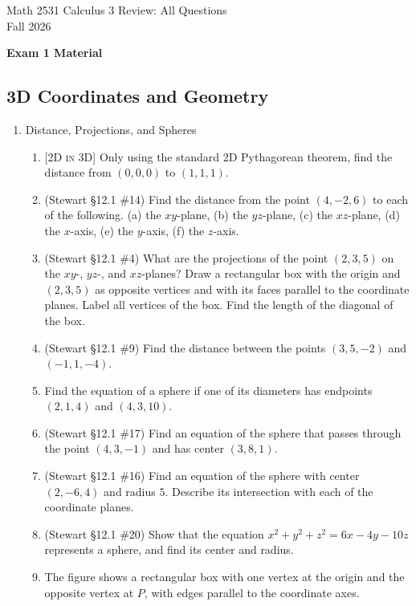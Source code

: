 \documentclass[12pt]{article}
\newcommand{\dimtag}[1]{{\footnotesize\textsc{[#1]}}\;}
\newcounter{topic}
\newcommand{\examhead}[1]{\begin{center}{\large\textbf{#1}}\end{center}}
\begin{document}
\raggedright
\begin{center}
      {\large Math 2531 Calculus 3 Review: All Questions}\\
  {Fall 2026}\\
\end{center}

\examhead{Exam 1 Material}
\subsection*{3D Coordinates and Geometry}
\begin{enumerate}\setcounter{enumi}{\value{topic}}

\item Distance, Projections, and Spheres
    \begin{enumerate}
        \item \dimtag{2D in 3D} Only using the standard 2D Pythagorean theorem, find the distance from $(0,0,0)$ to $ (1,1,1)$.
        \item (Stewart \S12.1 \#14) Find the distance from the point $(4,-2,6)$ to each of the following. (a) the $xy$-plane, (b) the $yz$-plane, (c) the $xz$-plane, (d) the $x$-axis, (e) the $y$-axis, (f) the $z$-axis.
        \item (Stewart \S12.1 \#4) What are the projections of the point $(2, 3, 5)$ on the $xy$-, $yz$-, and $xz$-planes? Draw a rectangular box with the origin and $(2,3,5)$ as opposite vertices and with its faces parallel to the coordinate planes. Label all vertices of the box. Find the length of the diagonal of the box.
        \item (Stewart \S12.1 \#9) Find the distance between the points $(3,5,-2)$ and $(-1,1,-4)$.
        \item Find the equation of a sphere if one of its diameters has endpoints $(2, 1, 4)$ and $(4, 3, 10)$.
        \item (Stewart \S12.1 \#17) Find an equation of the sphere that passes through the point $(4,3,-1)$ and has center $(3,8,1)$.
        \item (Stewart \S12.1 \#16) Find an equation of the sphere with center $(2,-6,4)$ and radius $5$. Describe its intersection with each of the coordinate planes.
        \item (Stewart \S12.1 \#20) Show that the equation $x^2 + y^2 + z^2 = 6x - 4y - 10z$ represents a sphere, and find its center and radius.
        \item The figure shows a rectangular box with one vertex at the origin and the opposite vertex at $P$, with edges parallel to the coordinate axes.

\end{enumerate}
\end{enumerate}
\end{document}
